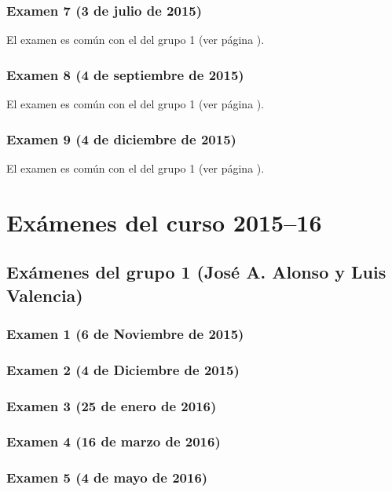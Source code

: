 \documentclass[a4paper,12pt,twoside]{book}
\begin{document}
\subsection{Examen 7 (3 de julio de 2015)}
El examen es común con el del grupo 1 (ver página \pageref{examen_14_15_5_7}).
\subsection{Examen 8 (4 de septiembre de 2015)}
El examen es común con el del grupo 1 (ver página \pageref{examen_14_15_5_8}).
\subsection{Examen 9 (4 de diciembre de 2015)}
El examen es común con el del grupo 1 (ver página \pageref{examen_14_15_5_9}).

\chapter{Exámenes del curso 2015--16}

\section{Exámenes del grupo 1 (José A. Alonso y Luis Valencia)}
\subsection{Examen 1 (6 de Noviembre de 2015)}
\subsection{Examen 2 (4 de Diciembre de 2015)}
\subsection{Examen 3 (25 de enero de 2016)}
 \label{examen_15_16_4_3}
\subsection{Examen 4 (16 de marzo de 2016)}
\subsection{Examen 5 (4 de mayo de 2016)}
\end{document}
